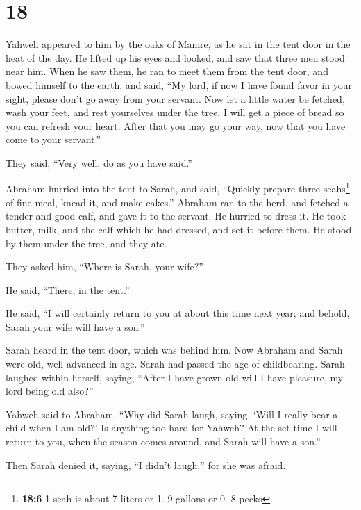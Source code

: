 \hypertarget{section-17}{%
\section{18}\label{section-17}}

 Yahweh appeared to him by the oaks of Mamre, as he sat in
the tent door in the heat of the day.  He lifted up his
eyes and looked, and saw that three men stood near him. When he saw
them, he ran to meet them from the tent door, and bowed himself to the
earth,  and said, ``My lord, if now I have found favor in
your sight, please don't go away from your servant.  Now
let a little water be fetched, wash your feet, and rest yourselves under
the tree.  I will get a piece of bread so you can refresh
your heart. After that you may go your way, now that you have come to
your servant.''

They said, ``Very well, do as you have said.''

 Abraham hurried into the tent to Sarah, and said,
``Quickly prepare three seahs\footnote{\textbf{18:6} 1 seah is about 7
  liters or 1. 9 gallons or 0. 8 pecks} of fine meal, knead it, and make
cakes.''  Abraham ran to the herd, and fetched a tender
and good calf, and gave it to the servant. He hurried to dress it.
 He took butter, milk, and the calf which he had dressed,
and set it before them. He stood by them under the tree, and they ate.

 They asked him, ``Where is Sarah, your wife?''

He said, ``There, in the tent.''

 He said, ``I will certainly return to you at about this
time next year; and behold, Sarah your wife will have a son.''

Sarah heard in the tent door, which was behind him.  Now
Abraham and Sarah were old, well advanced in age. Sarah had passed the
age of childbearing.  Sarah laughed within herself,
saying, ``After I have grown old will I have pleasure, my lord being old
also?''

 Yahweh said to Abraham, ``Why did Sarah laugh, saying,
`Will I really bear a child when I am old?'  Is anything
too hard for Yahweh? At the set time I will return to you, when the
season comes around, and Sarah will have a son.''

 Then Sarah denied it, saying, ``I didn't laugh,'' for
she was afraid.

